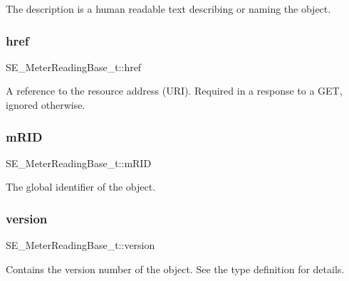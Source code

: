 The description is a human readable text describing or naming the object. \mbox{\label{group__MeterReadingBase_ga9f76ab492ecd22bec26e715a88738b88}} 
\subsubsection{\texorpdfstring{href}{href}}
{\footnotesize\ttfamily S\+E\+\_\+\+Meter\+Reading\+Base\+\_\+t\+::href}

A reference to the resource address (U\+RI). Required in a response to a G\+ET, ignored otherwise. \mbox{\label{group__MeterReadingBase_gae4ef9b5a1be0798622ffcbc81eab7647}} 
\subsubsection{\texorpdfstring{m\+R\+ID}{mRID}}
{\footnotesize\ttfamily S\+E\+\_\+\+Meter\+Reading\+Base\+\_\+t\+::m\+R\+ID}

The global identifier of the object. \mbox{\label{group__MeterReadingBase_ga094a26177e2ad97f8e2d4d606df742fc}} 
\subsubsection{\texorpdfstring{version}{version}}
{\footnotesize\ttfamily S\+E\+\_\+\+Meter\+Reading\+Base\+\_\+t\+::version}

Contains the version number of the object. See the type definition for details. 
